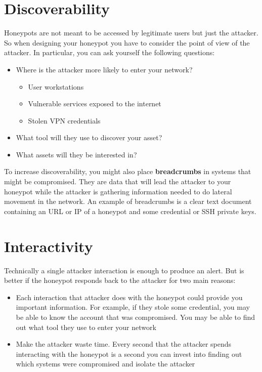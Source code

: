 \documentclass[epsfig,a4paper,11pt,titlepage,oneside,openany]{book}
\begin{document}
\section{Discoverability}
Honeypots are not meant to be accessed by legitimate users but just the attacker. So when designing your honeypot you have to consider the point of view of the attacker.
In particular, you can ask yourself the following questions:
\begin{itemize}
\item Where is the attacker more likely to enter your network?
	\begin{itemize}
	\item User workstations
	\item Vulnerable services exposed to the internet
	\item Stolen VPN credentials
	\end{itemize}
\item What tool will they use to discover your asset?
\item What assets will they be interested in?
\end{itemize}

To increase discoverability, you might also place \textbf{breadcrumbs} in systems that might be compromised. They are data that will lead the attacker to your honeypot while the attacker is gathering information needed to do lateral movement in the network. An example of breadcrumbs is a clear text document containing an URL or IP of a honeypot and some credential or SSH private keys.

\section{Interactivity}

Technically a single attacker interaction is enough to produce an alert. But is better if the honeypot responds back to the attacker for two main reasons:
\begin{itemize}
\item Each interaction that attacker does with the honeypot could provide you important information. For example, if they stole some credential, you may be able to know the account that was compromised. You may be able to find out what tool they use to enter  your network
\item Make the attacker waste time. Every second that the attacker spends interacting with the honeypot is a second you can invest into finding out which systems were compromised and isolate the attacker
\end{itemize}
\end{document}

